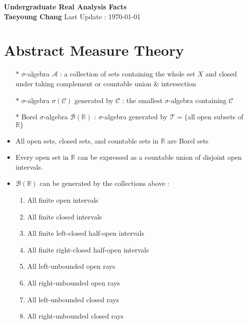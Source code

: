 \documentclass[12pt]{article}
\newcommand{\R}{\mathbb{R}}
\newcommand{\A}{\mathcal{A}}
\newcommand{\C}{\mathcal{C}}
\newcommand{\Borel}{\mathcal{B}(\mathbb{R})}
\begin{document}
\begin{titlepage}
	\begin{center}
		\vspace*{5cm}
		\textbf{\Large Undergraduate Real Analysis Facts}
		\\	
		\vspace{1.5cm}
		\textbf{Taeyoung Chang}
		\vfill
		Last Update : \today
		\vspace*{3cm}
		\thispagestyle{empty}
	\end{center}
\end{titlepage}
\tableofcontents
\clearpage
	
\section{Abstract Measure Theory}
\smallskip
\begin{itemize}
    \item[*] $\sigma$-algebra $\A$ : a collection of sets containing the whole set $X$ and closed under taking complement or countable union \& intersection 
    \item[*] $\sigma$-algebra $\sigma(\C)$ generated by $\C$ : the smallest $\sigma$-algebra containing $\C$  
    \item[*] Borel $\sigma$-algebra $\Borel$ : $\sigma$-algebra generated by $\mathcal{T}=\{$all open subsets of $\R\}$
    \item All open sets, closed sets, and countable sets in $\R$ are Borel sets 
    \item Every open set in $\R$ can be expressed as a countable union of disjoint open intervals.
    \item $\Borel$ can be generated by the collections above :
    \begin{enumerate}
        \item All finite open intervals
        \item All finite closed intervals
        \item All finite left-closed half-open intervals
        \item All finite right-closed half-open intervals
        \item All left-unbounded open rays
        \item All right-unbounded open rays
        \item All left-unbounded closed rays
        \item All right-unbounded closed rays
   

\end{enumerate}
\end{itemize}
\end{document}

